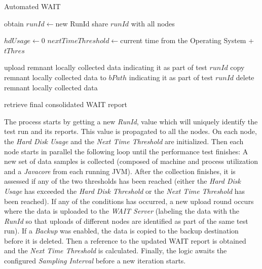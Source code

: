 \documentclass[runningheads,a4paper]{llncs}
\begin{document}
\begin{algorithm}
\caption{Automated WAIT}
\label{Proposed_Approach}
\DontPrintSemicolon
{}
\;
obtain $runId \gets $new RunId\;
share $runId$ with all nodes\;
 {
	$hdUsage \gets 0$\;
	$nextTimeThreshold \gets $current time from the Operating System + $tThres$\;
			
    \;
	
	\;
	upload remnant locally collected data indicating it as part of test $runId$\;
	 {
		copy remnant locally collected data to $bPath$ indicating it as part of test
		$runId$\; 
		}
		delete remnant locally collected data\;
  }
  retrieve final consolidated WAIT report\;
\end{algorithm}

The process starts by getting a new \emph{RunId}, value which will uniquely
identify the test run and its reports. This value is propagated to all
the nodes. On each node, the \emph{Hard Disk Usage} and  the \emph{Next Time
Threshold} are initialized. Then each node starts in parallel the following
loop until the performance test finishes: A new set of data samples is
collected (composed of machine and process utilization and a \emph{Javacore}
from each running JVM). After the collection finishes, it is assessed if any of
the two thresholds has been reached (either the \emph{Hard Disk Usage} has
exceeded the \emph{Hard Disk Threshold} or the \emph{Next Time Threshold} has
been reached). If any of the conditions has occurred, a new upload round occurs
where the data is uploaded to the \emph{WAIT Server} (labeling the data with the
\emph{RunId} so that uploads of different nodes are identified as part of the
same test run). If a \emph{Backup} was enabled, the data is copied to the backup
destination before it is deleted. Then a reference to the updated WAIT report is
obtained and the \emph{Next Time Threshold} is calculated. Finally, the logic
awaits the configured \emph{Sampling Interval} before a new iteration starts.
\end{document}
